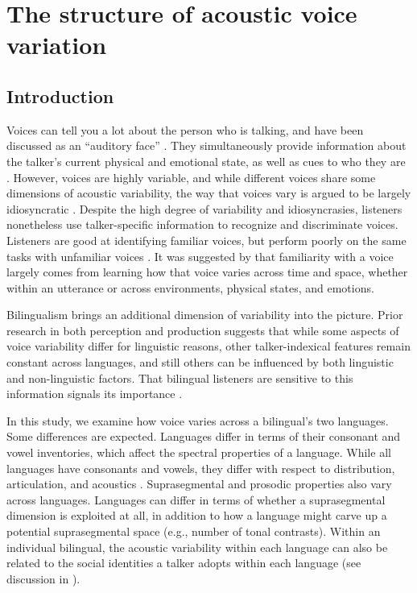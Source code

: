 \chapter{The structure of acoustic voice variation}
\label{ch3:Voice}


\section{Introduction}\label{ch3:sec:introduction}
Voices can tell you a lot about the person who is talking, and have been discussed as an ``auditory face'' \citep{belin_2004_voice}. They simultaneously provide information about the talker's current physical and emotional state, as well as cues to who they are \citep{belin_2004_voice}. However, voices are highly variable, and while different voices share some dimensions of acoustic variability, the way that voices vary is argued to be largely idiosyncratic \citep{lee_2019_acoustic-paper}. Despite the high degree of variability and idiosyncrasies, listeners nonetheless use talker-specific information to recognize and discriminate voices. Listeners are good at identifying familiar voices, but perform poorly on the same tasks with unfamiliar voices \citep{nygaard_1998_talker}. It was suggested by \citet{lee_2019_acoustic-paper} that familiarity with a voice largely comes from learning how that voice varies across time and space, whether within an utterance or across environments, physical states, and emotions.

Bilingualism brings an additional dimension of variability into the picture. Prior research in both perception and production suggests that while some aspects of voice variability differ for linguistic reasons, other talker-indexical features remain constant across languages, and still others can be influenced by both linguistic and non-linguistic factors. That bilingual listeners are sensitive to this information signals its importance \citep{orena_2019_identifying,fricke_2016_phonetic}.

In this study, we examine how voice varies across a bilingual's two languages. Some differences are expected. Languages differ in terms of their consonant and vowel inventories, which affect the spectral properties of a language. While all languages have consonants and vowels, they differ with respect to distribution, articulation, and acoustics . Suprasegmental and prosodic properties also vary across languages. Languages can differ in terms of whether a suprasegmental dimension is exploited at all, in addition to how a language might carve up a potential suprasegmental space (e.g., number of tonal contrasts). Within an individual bilingual, the acoustic variability within each language can also be related to the social identities a talker adopts within each language (see discussion in \citet{cheng_2020_f0}). 

